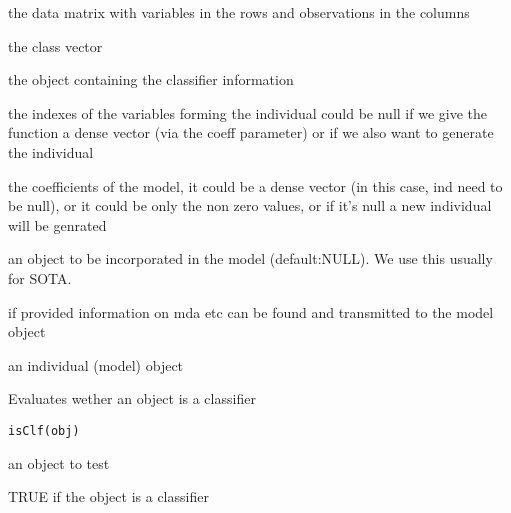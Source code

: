 \documentclass[a4paper]{book}
\begin{document}
%
\begin{Arguments}
\begin{ldescription}
\item[\code{X:}] the data matrix with variables in the rows and observations in the columns

\item[\code{y:}] the class vector

\item[\code{clf:}] the object containing the classifier information

\item[\code{ind:}] the indexes of the variables forming the individual could be null if we give the function a dense vector (via the coeff parameter) or if we also want to generate the individual

\item[\code{coeffs:}] the coefficients of the model, it could be a dense vector (in this case, ind need to be null), or it could be only the non zero values, or if it's null a new individual will be genrated

\item[\code{obj:}] an object to be incorporated in the model (default:NULL). We use this usually for SOTA.

\item[\code{res\_clf:}] if provided information on mda etc can be found and transmitted to the model object
\end{ldescription}
\end{Arguments}
%
\begin{Value}
an individual (model) object
\end{Value}
%
\begin{Description}
Evaluates wether an object is a classifier
\end{Description}
%
\begin{Usage}
\begin{verbatim}
isClf(obj)
\end{verbatim}
\end{Usage}
%
\begin{Arguments}
\begin{ldescription}
\item[\code{obj:}] an object to test
\end{ldescription}
\end{Arguments}
%
\begin{Value}
TRUE if the object is a classifier
\end{Value}
\end{document}

